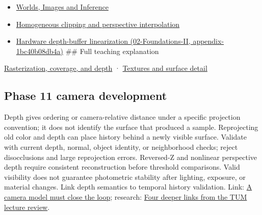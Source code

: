 \begin{itemize}
\item
  \href{Continuous\%20Notes/University\%20-\%20Worlds,\%20Images\%20and\%20Inference\%20-\%20Graphics,\%20Vision\%20and\%20Photography}{Worlds, Images and Inference}
\item
  \hyperref[appendix-40426e4b2103]{Homogeneous clipping and perspective interpolation}
\item
  \href{}{Hardware depth-buffer linearization (02-Foundations-II, appendix-1bc40b08db4a)} \#\# Full teaching explanation
\end{itemize}

\href{Continuous\%20Notes/University\%20-\%20Worlds,\%20Images\%20and\%20Inference\%20-\%20Graphics,\%20Vision\%20and\%20Photography\#Rasterization,\%20coverage,\%20and\%20depth}{Rasterization, coverage, and depth} · \href{Continuous\%20Notes/University\%20-\%20Worlds,\%20Images\%20and\%20Inference\%20-\%20Graphics,\%20Vision\%20and\%20Photography\#Textures\%20and\%20surface\%20detail}{Textures and surface detail}

\subsection{Phase 11 camera development}\label{phase-11-camera-development}

Depth gives ordering or camera-relative distance under a specific projection convention; it does not identify the surface that produced a sample. Reprojecting old color and depth can place history behind a newly visible surface. Validate with current depth, normal, object identity, or neighborhood checks; reject disocclusions and large reprojection errors. Reversed-Z and nonlinear perspective depth require consistent reconstruction before threshold comparisons. Valid visibility does not guarantee photometric stability after lighting, exposure, or material changes. Link depth semantics to temporal history validation. Link: \href{Continuous\%20Notes/Computing\%20Foundations\%20-\%20From\%20Bits\%20to\%20C++\%20and\%20Systems\%20APIs\#A\%20camera\%20model\%20must\%20close\%20the\%20loop}{A camera model must close the loop}; research: \href{Continuous\%20Notes/Computing\%20Foundations\%20-\%20From\%20Bits\%20to\%20C++\%20and\%20Systems\%20APIs\#Four\%20deeper\%20links\%20from\%20the\%20TUM\%20lecture\%20review}{Four deeper links from the TUM lecture review}.
